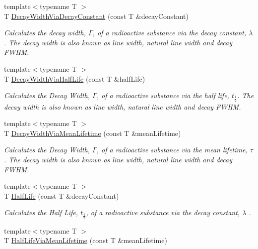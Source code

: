 \begin{DoxyCompactItemize}
{\footnotesize template$<$typename T $>$ }\\T \mbox{\hyperlink{group___e_g_x_phys-_decay_width_ga143a666966efecc535a59bb4f36a79c6}{Decay\+Width\+Via\+Decay\+Constant}} (const T \&decay\+Constant)
\begin{DoxyCompactList}\small\item\em Calculates the decay width, $\Gamma$, of a radioactive substance via the decay constant, $\lambda$. The decay width is also known as line width, natural line width and decay F\+W\+HM. \end{DoxyCompactList}\item 
{\footnotesize template$<$typename T $>$ }\\T \mbox{\hyperlink{group___e_g_x_phys-_decay_width_ga1113224b24790a2e34032f9e90ad55c6}{Decay\+Width\+Via\+Half\+Life}} (const T \&half\+Life)
\begin{DoxyCompactList}\small\item\em Calculates the Decay Width, $\Gamma$, of a radioactive substance via the half life, $t_{\frac{1}{2}}$. The decay width is also known as line width, natural line width and decay F\+W\+HM. \end{DoxyCompactList}\item 
{\footnotesize template$<$typename T $>$ }\\T \mbox{\hyperlink{group___e_g_x_phys-_decay_width_ga0b65d991f3f3d72cf09a4a7b343a01ca}{Decay\+Width\+Via\+Mean\+Lifetime}} (const T \&mean\+Lifetime)
\begin{DoxyCompactList}\small\item\em Calculates the Decay Width, $\Gamma$, of a radioactive substance via the mean lifetime, $\tau$. The decay width is also known as line width, natural line width and decay F\+W\+HM. \end{DoxyCompactList}\item 
{\footnotesize template$<$typename T $>$ }\\T \mbox{\hyperlink{group___e_g_x_phys-_half_life_ga21d268f154fb91c1c556bbfa7fe83ac1}{Half\+Life}} (const T \&decay\+Constant)
\begin{DoxyCompactList}\small\item\em Calculates the Half Life, $t_{\frac{1}{2}}$, of a radioactive substance via the decay constant, $\lambda$ . \end{DoxyCompactList}\item 
{\footnotesize template$<$typename T $>$ }\\T \mbox{\hyperlink{group___e_g_x_phys-_half_life_gacddef16b62e98b214ec8dd8af7da7dce}{Half\+Life\+Via\+Mean\+Lifetime}} (const T \&mean\+Lifetime)

\end{DoxyCompactItemize}
